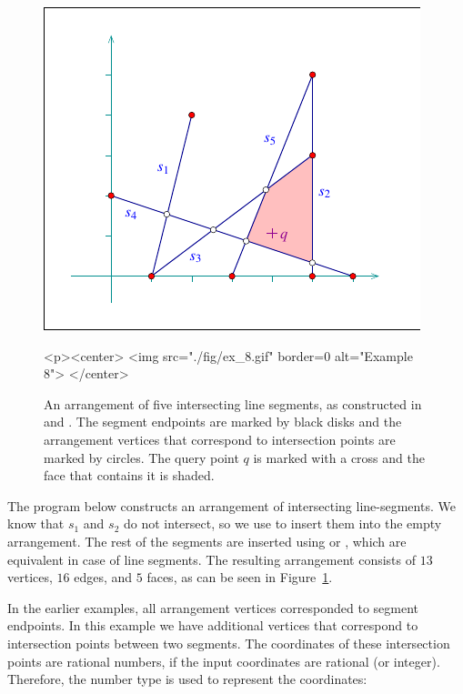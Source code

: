 \begin{figure}[t]
\begin{ccTexOnly}
  \begin{center}
  \includegraphics{Arrangement_2/fig/ex_8}
  \end{center}
\end{ccTexOnly}
\begin{ccHtmlOnly}
  <p><center>
  <img src="./fig/ex_8.gif" border=0 alt="Example 8">
  </center>
\end{ccHtmlOnly}
\caption{An arrangement of five intersecting line segments, as
constructed in  and
. The segment
endpoints are marked by black disks and the arrangement vertices
that correspond to intersection points are marked by circles.
The query point $q$ is marked with a cross and the face that
contains it is shaded.\label{arr_fig:ex_8}}
\end{figure}

The program below constructs an arrangement of intersecting
line-segments. We know that $s_1$ and $s_2$ do not intersect, so
we use  to insert them into the
empty arrangement. The rest of the segments are inserted using
 or , which are
equivalent in case of line segments. The resulting arrangement consists
of $13$ vertices, $16$ edges, and $5$ faces, as can be seen in
Figure~\ref{arr_fig:ex_8}.

In the earlier examples, all arrangement vertices corresponded to
segment endpoints. In this example we have additional vertices that
correspond to intersection points between two segments. The
coordinates of these intersection points are rational numbers, if
the input coordinates are rational (or integer). Therefore,
the  number type is used to represent the
coordinates:

